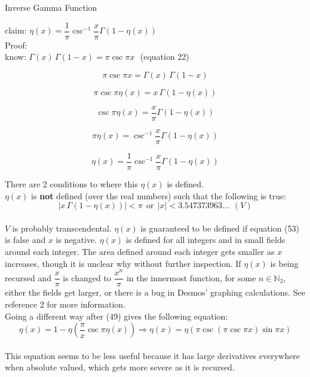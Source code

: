 \documentclass[12pt]{article}
\begin{document}
\pagebreak\begin{section}{Inverse Gamma Function}
	
	claim: $\eta(x)=\dfrac1\pi\csc^{-1}\dfrac x\pi\Gamma(1-\eta(x))$\\
	Proof:\\
	know: $\Gamma(x)\,\Gamma(1-x)=\pi\csc\pi x~~~$(equation 22)

	\begin{equation}\pi\csc\pi x=\Gamma(x)\,\Gamma(1-x)\end{equation}

	\begin{equation}\pi\csc\pi\eta(x)=x\,\Gamma(1-\eta(x))\end{equation}

	\begin{equation}\csc\pi\eta(x)=\dfrac x\pi\Gamma(1-\eta(x))\end{equation}

	\begin{equation}\pi\eta(x)=\csc^{-1}\dfrac x\pi\Gamma(1-\eta(x))\end{equation}

	\begin{equation}\eta(x)=\dfrac1\pi\csc^{-1}\dfrac x\pi\Gamma(1-\eta(x))\end{equation}

	\noindent\blacksquare

	\noindent There are 2 conditions to where this $\eta(x)$ is defined.\\
	$\eta(x)$ is \textbf{not} defined (over the real numbers) such that the following is true:\\
	\begin{equation}
		|x\,\Gamma(1-\eta(x))|<\pi~~\text{or}~~|x|<3.547373963...~~(V)
	\end{equation}\\
	$V$ is probably transcendental. $\eta(x)$ is guaranteed to be defined if equation (53) is false and $x$ is negative. $\eta(x)$ is defined for all integers and in small fields around each integer. The area defined around each integer gets smaller as $x$ increases, though it is unclear why without further inspection. If $\eta(x)$ is being recursed and $\dfrac x\pi$ is changed to $\dfrac{x^n}\pi$ in the innermost function, for some $n\in\mathbb N_2$, either the fields get larger, or there is a bug in Desmos' graphing calculations. See reference 2 for more information.\\
	Going a different way after (49) gives the following equation:\\
	\begin{equation}
		\eta(x)=1-\eta\left(\dfrac\pi x\csc\pi\eta(x)\right)\Longrightarrow\eta(x)=\eta(\pi\csc(\pi\csc\pi x)\sin\pi x)
	\end{equation}\\
	This equation seems to be less useful because it has large derivatives everywhere when absolute valued, which gets more severe as it is recursed.
\end{section}
\end{document}
